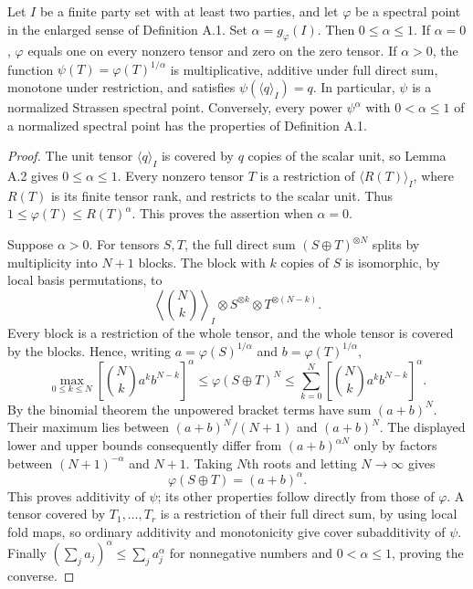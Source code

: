 \begin{proposition}
\label{prop:spectral-normalization}
Let $I$ be a finite party set with at least two parties, and let
$\varphi$ be a spectral point in the enlarged sense of Definition A.1.
Set $\alpha=g_\varphi(I)$.  Then $0\le\alpha\le1$.
If $\alpha=0$, $\varphi$ equals one on every nonzero tensor and zero on
the zero tensor.  If $\alpha>0$, the function
$\psi(T)=\varphi(T)^{1/\alpha}$ is multiplicative, additive under full
direct sum, monotone under restriction, and satisfies
$\psi(\langle q\rangle_I)=q$.  In particular, $\psi$ is a normalized
Strassen spectral point.  Conversely, every power $\psi^\alpha$ with
$0<\alpha\le1$ of a normalized spectral point has the properties of
Definition A.1.
\end{proposition}
\begin{proof}
The unit tensor $\langle q\rangle_I$ is covered by $q$ copies of the
scalar unit, so Lemma A.2 gives $0\le\alpha\le1$.  Every nonzero tensor
$T$ is a restriction of $\langle R(T)\rangle_I$, where $R(T)$ is its
finite tensor rank, and restricts to the scalar unit.  Thus
$1\le\varphi(T)\le R(T)^\alpha$.  This proves the assertion when
$\alpha=0$.

Suppose $\alpha>0$.  For tensors $S,T$, the full direct sum
$(S\oplus T)^{\otimes N}$ splits by multiplicity into $N+1$ blocks.
The block with $k$ copies of $S$ is isomorphic, by local basis
permutations, to
\[
 \left\langle\binom Nk\right\rangle_I
   \otimes S^{\otimes k}\otimes T^{\otimes(N-k)}.
\]
Every block is a restriction of the whole tensor, and the whole tensor
is covered by the blocks.  Hence, writing
$a=\varphi(S)^{1/\alpha}$ and $b=\varphi(T)^{1/\alpha}$,
\[
 \max_{0\le k\le N}
   \left[\binom Nk a^k b^{N-k}\right]^\alpha
 \le \varphi(S\oplus T)^N
 \le \sum_{k=0}^N
   \left[\binom Nk a^k b^{N-k}\right]^\alpha.
\]
By the binomial theorem the unpowered bracket terms have sum
$(a+b)^N$.  Their maximum lies between $(a+b)^N/(N+1)$ and
$(a+b)^N$.  The displayed lower and upper bounds consequently differ
from $(a+b)^{\alpha N}$ only by factors between
$(N+1)^{-\alpha}$ and $N+1$.  Taking $N$th roots and letting
$N\to\infty$ gives
\[
 \varphi(S\oplus T)=(a+b)^\alpha.
\]
This proves additivity of $\psi$; its other properties follow directly
from those of $\varphi$.  A tensor covered by $T_1,\ldots,T_r$ is a
restriction of their full direct sum, by using local fold maps, so
ordinary additivity and monotonicity give cover subadditivity of
$\psi$.  Finally
$(\sum_j a_j)^\alpha\le\sum_j a_j^\alpha$ for nonnegative numbers
and $0<\alpha\le1$, proving the converse.
\end{proof}

